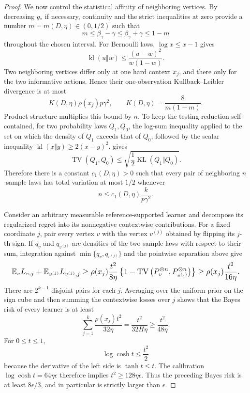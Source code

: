 \documentclass{article}
\begin{document}
\begin{proof}
We now control the statistical affinity of neighboring vertices. By decreasing \(g_*\) if necessary, continuity and the strict inequalities at zero provide a number \(m=m(D,\eta)\in(0,1/2)\) such that
\[
m\le\beta_\gamma-\gamma
\le\beta_\gamma+\gamma\le1-m
\]
throughout the chosen interval. For Bernoulli laws, \(\log x\le x-1\) gives
\[
\operatorname{kl}(u\Vert w)
\le\frac{(u-w)^2}{w(1-w)}.
\]
Two neighboring vertices differ only at one hard context \(x_j\), and there only for the two informative actions. Hence their one-observation Kullback--Leibler divergence is at most
\[
K(D,\eta)\rho(x_j)p\gamma^2,
\qquad
K(D,\eta)=\frac8{m(1-m)}.
\]
Product structure multiplies this bound by \(n\). To keep the testing reduction self-contained, for two probability laws \(Q_1,Q_0\), the log-sum inequality applied to the set on which the density of \(Q_1\) exceeds that of \(Q_0\), followed by the scalar inequality \(\operatorname{kl}(x\Vert y)\ge2(x-y)^2\), gives
\[
\operatorname{TV}(Q_1,Q_0)
\le\sqrt{\frac12\operatorname{KL}(Q_1\Vert Q_0)}.
\]
Therefore there is a constant \(c_1(D,\eta)>0\) such that every pair of neighboring \(n\)-sample laws has total variation at most \(1/2\) whenever
\[
n\le c_1(D,\eta)\frac{k}{p\gamma^2}.
\]

Consider an arbitrary measurable reference-supported learner and decompose its regularized regret into its nonnegative contextwise contributions. For a fixed coordinate \(j\), pair every vertex \(v\) with the vertex \(v^{(j)}\) obtained by flipping its \(j\)-th sign. If \(q_v\) and \(q_{v^{(j)}}\) are densities of the two sample laws with respect to their sum, integration against \(\min\{q_v,q_{v^{(j)}}\}\) and the pointwise separation above give
\[
\makebox[\linewidth][c]{\resizebox{0.98\linewidth}{!}{\(\displaystyle \mathbb E_v L_{v,j}+
\mathbb E_{v^{(j)}}L_{v^{(j)},j}
\ge
\rho(x_j)\frac{t^2}{8\eta}
\left\{1-\operatorname{TV}\left(P_v^{\otimes n},P_{v^{(j)}}^{\otimes n}\right)\right\}
\ge
\rho(x_j)\frac{t^2}{16\eta}.\)}}
\]
There are \(2^{k-1}\) disjoint pairs for each \(j\). Averaging over the uniform prior on the sign cube and then summing the contextwise losses over \(j\) shows that the Bayes risk of every learner is at least
\[
\sum_{j=1}^k\frac{\rho(x_j)t^2}{32\eta}
=
\frac{t^2}{32H\eta}
\ge
\frac{t^2}{48\eta}.
\]
For \(0\le t\le1\),
\[
\log\cosh t\le\frac{t^2}{2}
\]
because the derivative of the left side is \(\tanh t\le t\). The calibration \(\log\cosh t=64\eta\epsilon\) therefore implies \(t^2\ge128\eta\epsilon\). Thus the preceding Bayes risk is at least \(8\epsilon/3\), and in particular is strictly larger than \(\epsilon\).


\end{proof}
\end{document}
